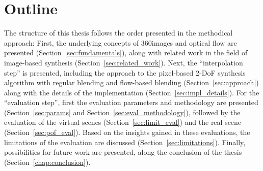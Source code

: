 

\section*{Outline}
The structure of this thesis follows the order presented in the methodical approach: 
First, the underlying concepts of 360\degree images and optical flow are presented (Section~\ref{sec:fundamentals}), along with related work in the field of image-based synthesis (Section~\ref{sec:related_work}). Next, the ``interpolation step'' is presented, including the approach to the pixel-based 2-DoF synthesis algorithm with regular blending and flow-based blending (Section~\ref{sec:approach}) along with the details of the implementation (Section~\ref{sec:impl_details}).
For the ``evaluation step'', first the evaluation parameters and methodology are presented (Section~\ref{sec:params} and Section~\ref{sec:eval_methodology}), followed by the evaluation of the virtual scenes (Section~\ref{sec:limit_eval}) and the real scene (Section~\ref{sec:pof_eval}). Based on the insights gained in these evaluations, the limitations of the evaluation are discussed (Section~\ref{sec:limitations}).
Finally, possibilities for future work are presented, along the conclusion of the thesis (Section~\ref{chap:conclusion}).

